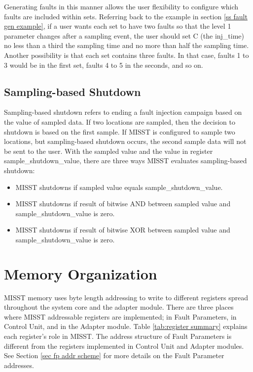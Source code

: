 \documentclass[]{report}
\begin{document}
Generating faults in this manner allows the user flexibility to configure which faults are included within sets. Referring back to the example in section \ref{ss fault gen example}, if a user wants each set to have two faults so that the level 1 parameter changes after a sampling event, the user should set C (the inj\_time) no less than a third the sampling time and no more than half the sampling time. Another possibility is that each set contains three faults. In that case, faults 1 to 3 would be in the first set, faults 4 to 5 in the seconds, and so on.  

\clearpage
\subsection{Sampling-based Shutdown}
\label{ss samping-based shutdown}

Sampling-based shutdown refers to ending a fault injection campaign based on the value of sampled data. If two locations are sampled, then the decision to shutdown is based on the first sample. If MISST is configured to sample two locations, but sampling-based shutdown occurs, the second sample data will not be sent to the user. With the sampled value and the value in register sample\_shutdown\_value, there are three ways MISST evaluates sampling-based shutdown:
\begin{itemize}
	\item MISST shutdowns if sampled value equals sample\_shutdown\_value.
	\item MISST shutdowns if result of bitwise AND between sampled value and sample\_shutdown\_value is zero.
	\item MISST shutdowns if result of bitwise XOR between sampled value and sample\_shutdown\_value is zero.
\end{itemize}

\section{Memory Organization}

MISST memory uses byte length addressing to write to different registers spread throughout the system core and the adapter module. There are three places where MISST addressable registers are implemented; in Fault Parameters, in Control Unit, and in the Adapter module. Table \ref{tab:register summary} explains each register's role in MISST. The address structure of Fault Parameters is different from the registers implemented in Control Unit and Adapter modules. See Section \ref{sec fp addr scheme} for more details on the Fault Parameter addresses. 
\end{document}

